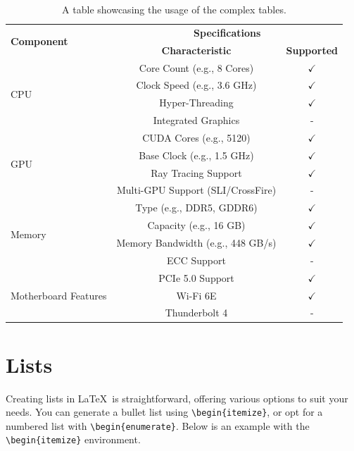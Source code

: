 {\begin{table}[!htpb]
    \caption{A table showcasing the usage of the complex tables.}
    \label{tab:table-04}
    \centering
    \begin{tabular}{lcc}
        \toprule
        \multirow{2}{*}{\textbf{Component}} & \multicolumn{2}{c}{\textbf{Specifications}} \\
        \cmidrule(lr){2-3}
        & \textbf{Characteristic} & \textbf{Supported} \\
        \midrule
        \multirow{4}{*}{CPU} & Core Count (e.g., 8 Cores) & $\checkmark$ \\
        & Clock Speed (e.g., 3.6 GHz) & $\checkmark$ \\
        & Hyper-Threading & $\checkmark$ \\
        & Integrated Graphics & - \\
        \midrule
        \multirow{4}{*}{GPU} & CUDA Cores (e.g., 5120) & $\checkmark$ \\
        & Base Clock (e.g., 1.5 GHz) & $\checkmark$ \\
        & Ray Tracing Support & $\checkmark$ \\
        & Multi-GPU Support (SLI/CrossFire) & - \\
        \midrule
        \multirow{4}{*}{Memory} & Type (e.g., DDR5, GDDR6) & $\checkmark$ \\
        & Capacity (e.g., 16 GB) & $\checkmark$ \\
        & Memory Bandwidth (e.g., 448 GB/s) & $\checkmark$ \\
        & ECC Support & - \\
        \midrule
        \multirow{3}{*}{Motherboard Features} & PCIe 5.0 Support & $\checkmark$ \\
        & Wi-Fi 6E & $\checkmark$ \\
        & Thunderbolt 4 & - \\
        \bottomrule
    \end{tabular}
\end{table}

\section{Lists}
Creating lists in \LaTeX\ is straightforward, offering various options to suit your needs. You can generate a bullet list using \verb|\begin{itemize}|, or opt for a numbered list with \verb|\begin{enumerate}|. Below is an example with the \verb|\begin{itemize}| environment.

}
